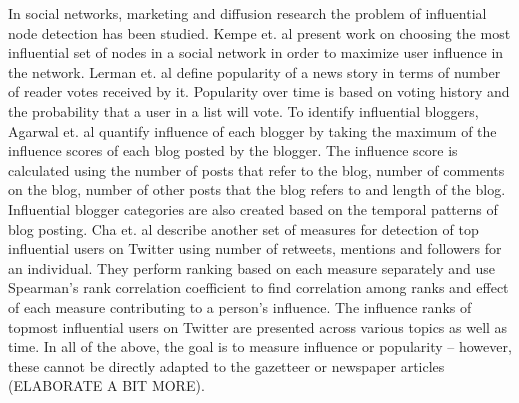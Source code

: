 \documentclass[a4paper,man,natbib]{apa6}
\begin{document}
In social networks, marketing and diffusion research the problem of influential node detection has been studied.
Kempe et. al \cite{kempe2003maximizing} present work on choosing the most influential set of nodes in a social network in order to maximize user influence in the network. 
Lerman et. al \cite{lerman2010using} define popularity of a news story in terms of number of reader votes received by it. Popularity over time is based on voting history and the probability that a user in a list will vote. To identify influential bloggers, Agarwal et. al\cite{agarwal2008identifying} quantify influence of each blogger by taking the maximum of the influence scores of each blog posted by the blogger. The influence score is calculated using the number of posts that refer to the blog, number of comments on the blog, number of other posts that the blog refers to and length of the blog. Influential blogger categories are also created based on the temporal patterns of blog posting. Cha et. al\cite{cha2010measuring} describe another set of measures for detection of top influential users on Twitter using number of retweets, mentions and followers for an individual. They perform ranking based on each measure separately and use Spearman's rank correlation coefficient to find correlation among ranks and effect of each measure contributing to a person's influence. The influence ranks of topmost influential users on Twitter are presented across various topics as well as time. In all of the above, the goal is to measure influence or popularity -- however, these cannot be directly adapted to the gazetteer or newspaper articles (ELABORATE A BIT MORE). 
\end{document}
